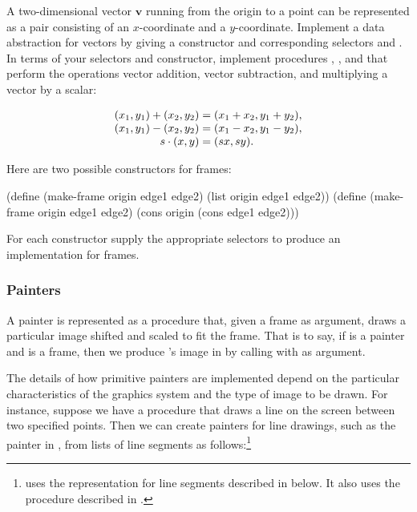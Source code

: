 \begin{exerciseGroup}
\label{Exercise 2.46}
 A two-dimensional vector \( \mathbf{v} \)
running from the origin to a point can be represented as a pair consisting of
an \( x \)-coordinate and a \( y \)-coordinate.  Implement a data abstraction for
vectors by giving a constructor  and corresponding selectors
 and .  In terms of your selectors and
constructor, implement procedures , , and
 that perform the operations vector addition, vector
subtraction, and multiplying a vector by a scalar:

$$
\begin{array}{r@{{}={}}l}
	(x_1, y_1) + (x_2, y_2) 	& (x_1 + x_2, y_1 + y_2), \\
	(x_1, y_1) - (x_2, y_2) 	& (x_1 - x_2, y_1 - y_2), \\
	s \cdot (x, y) 			& (sx, sy).
\end{array}
$$


\label{Exercise 2.47}
 Here are two possible
constructors for frames:

\begin{codeBlock}
(define (make-frame origin edge1 edge2)
  (list origin edge1 edge2))
(define (make-frame origin edge1 edge2)
  (cons origin (cons edge1 edge2)))
\end{codeBlock}

For each constructor supply the appropriate selectors to produce an
implementation for frames.
\end{exerciseGroup}

\subsubsection*{Painters}

A painter is represented as a procedure that, given a frame as argument, draws
a particular image shifted and scaled to fit the frame.  That is to say, if
 is a painter and  is a frame, then we produce 's image
in  by calling  with  as argument.

The details of how primitive painters are implemented depend on the particular
characteristics of the graphics system and the type of image to be drawn.  For
instance, suppose we have a procedure  that draws a line on the
screen between two specified points.  Then we can create painters for line
drawings, such as the  painter in , from lists of
line segments as follows:\footnote{ uses the
representation for line segments described in  below.  It
also uses the  procedure described in .}

